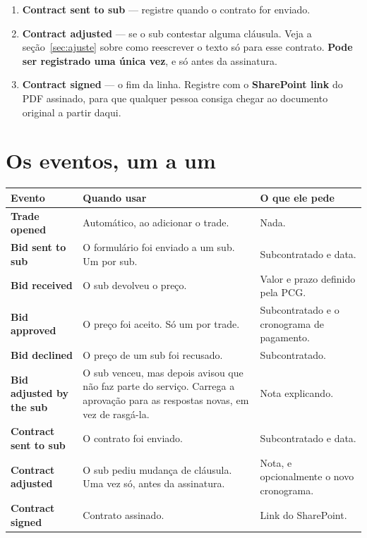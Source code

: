 \documentclass[11pt,a4paper]{article}
\newcommand{\ui}[1]{\textbf{\textsf{#1}}}
\begin{document}
\begin{enumerate}
  \item \ui{Contract sent to sub} — registre quando o contrato for enviado.

  \item \ui{Contract adjusted} — se o sub contestar alguma cláusula. Veja a
  seção~\ref{sec:ajuste} sobre como reescrever o texto só para esse contrato.
  \textbf{Pode ser registrado uma única vez}, e só antes da assinatura.

  \item \ui{Contract signed} — o fim da linha. Registre com o
  \ui{SharePoint link} do PDF assinado, para que qualquer pessoa consiga chegar
  ao documento original a partir daqui.
\end{enumerate}

\section{Os eventos, um a um}

\begin{longtable}{@{}p{3.9cm}p{5.3cm}p{5.2cm}@{}}
\toprule
\textbf{Evento} & \textbf{Quando usar} & \textbf{O que ele pede} \\
\midrule
\endhead
\ui{Trade opened} & Automático, ao adicionar o trade. & Nada. \\[4pt]

\ui{Bid sent to sub} & O formulário foi enviado a um sub. Um por sub. &
Subcontratado e data. \\[4pt]

\ui{Bid received} & O sub devolveu o preço. & Valor e prazo definido pela PCG. \\[4pt]

\ui{Bid approved} & O preço foi aceito. Só um por trade. & Subcontratado e o
cronograma de pagamento. \\[4pt]

\ui{Bid declined} & O preço de um sub foi recusado. & Subcontratado. \\[4pt]

\ui{Bid adjusted by the sub} & O sub venceu, mas depois avisou que não faz parte
do serviço. Carrega a aprovação para as respostas novas, em vez de rasgá-la. &
Nota explicando. \\[4pt]

\ui{Contract sent to sub} & O contrato foi enviado. & Subcontratado e data. \\[4pt]

\ui{Contract adjusted} & O sub pediu mudança de cláusula. Uma vez só, antes da
assinatura. & Nota, e opcionalmente o novo cronograma. \\[4pt]

\ui{Contract signed} & Contrato assinado. & Link do SharePoint. \\
\bottomrule
\end{longtable}
\end{document}
